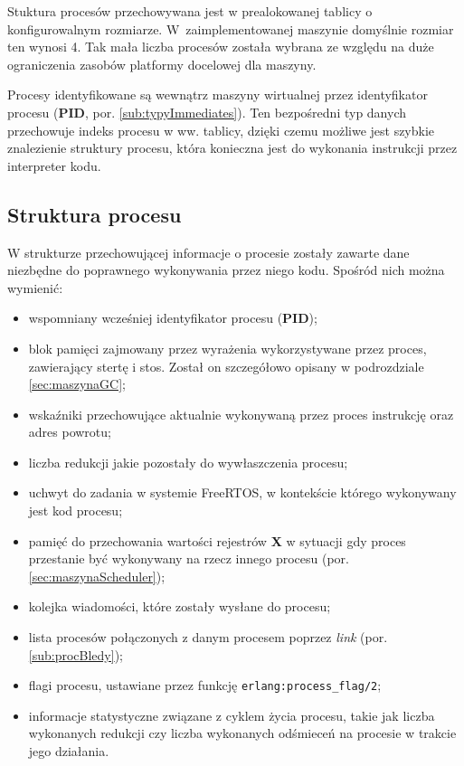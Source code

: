 Stuktura procesów przechowywana jest w prealokowanej tablicy o konfigurowalnym rozmiarze.
W~zaimplementowanej maszynie domyślnie rozmiar ten wynosi 4.
Tak mała liczba procesów została wybrana ze względu na duże ograniczenia zasobów platformy docelowej dla maszyny.

Procesy identyfikowane są wewnątrz maszyny wirtualnej przez identyfikator procesu (\textbf{PID}, por. \ref{sub:typyImmediates}).
Ten bezpośredni typ danych przechowuje indeks procesu w ww. tablicy, dzięki czemu możliwe jest szybkie znalezienie struktury procesu, która konieczna jest do wykonania instrukcji przez interpreter kodu.

\subsection{Struktura procesu}
\label{sub:procStruktura}

W strukturze przechowującej informacje o procesie zostały zawarte dane niezbędne do poprawnego wykonywania przez niego kodu.
Spośród nich można wymienić:
\begin{itemize}
\item wspomniany wcześniej identyfikator procesu (\textbf{PID});
\item blok pamięci zajmowany przez wyrażenia wykorzystywane przez proces, zawierający stertę i stos. Został on szczegółowo opisany w podrozdziale \ref{sec:maszynaGC};
\item wskaźniki przechowujące aktualnie wykonywaną przez proces instrukcję oraz adres powrotu;
\item liczba redukcji jakie pozostały do wywłaszczenia procesu;
\item uchwyt do zadania w systemie FreeRTOS, w kontekście którego wykonywany jest kod procesu;
\item pamięć do przechowania wartości rejestrów \textbf{X} w sytuacji gdy proces przestanie być wykonywany na rzecz innego procesu (por. \ref{sec:maszynaScheduler});
\item kolejka wiadomości, które zostały wysłane do procesu;
\item lista procesów połączonych z danym procesem poprzez \emph{link} (por. \ref{sub:procBledy});
\item flagi procesu, ustawiane przez funkcję \texttt{erlang:process\_flag/2};
\item informacje statystyczne związane z cyklem życia procesu, takie jak liczba wykonanych redukcji czy liczba wykonanych odśmieceń na procesie w trakcie jego działania.
\end{itemize}

